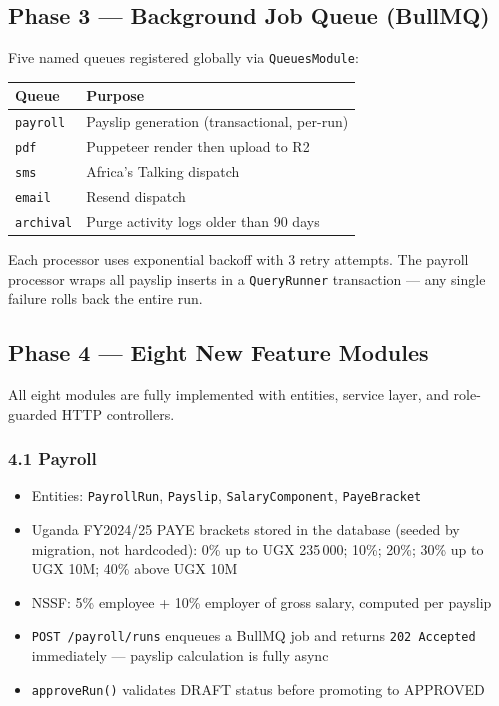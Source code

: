 \documentclass[11pt, a4paper]{article}
\newcommand{\code}[1]{\texttt{\small #1}}
\begin{document}
\subsection{Phase 3 --- Background Job Queue (BullMQ)}

Five named queues registered globally via \code{QueuesModule}:

\begin{center}
\begin{tabular}{@{}ll@{}}
  \toprule
  Queue & Purpose \\
  \midrule
  \code{payroll} & Payslip generation (transactional, per-run) \\
  \code{pdf} & Puppeteer render then upload to R2 \\
  \code{sms} & Africa's Talking dispatch \\
  \code{email} & Resend dispatch \\
  \code{archival} & Purge activity logs older than 90 days \\
  \bottomrule
\end{tabular}
\end{center}

Each processor uses exponential backoff with 3 retry attempts.
The payroll processor wraps all payslip inserts in a \code{QueryRunner}
transaction --- any single failure rolls back the entire run.

\subsection{Phase 4 --- Eight New Feature Modules}

All eight modules are fully implemented with entities, service layer,
and role-guarded HTTP controllers.

\subsubsection*{4.1 Payroll}

\begin{itemize}[leftmargin=1.5em, itemsep=0pt]
  \item Entities: \code{PayrollRun}, \code{Payslip}, \code{SalaryComponent}, \code{PayeBracket}
  \item Uganda FY2024/25 PAYE brackets stored in the database (seeded by migration,
    not hardcoded): 0\% up to UGX 235\,000; 10\%; 20\%; 30\% up to UGX 10M;
    40\% above UGX 10M
  \item NSSF: 5\% employee + 10\% employer of gross salary, computed per payslip
  \item \code{POST /payroll/runs} enqueues a BullMQ job and returns
    \code{202 Accepted} immediately --- payslip calculation is fully async
  \item \code{approveRun()} validates DRAFT status before promoting to APPROVED
\end{itemize}
\end{document}
